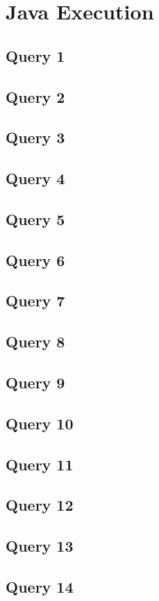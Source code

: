 \documentclass[11pt]{article}
\begin{document}
\section{Java Execution}
\subsection{Query 1}
\subsection{Query 2}
\subsection{Query 3}
\subsection{Query 4}
\subsection{Query 5}
\subsection{Query 6}
\subsection{Query 7}
\subsection{Query 8}
\subsection{Query 9}
\subsection{Query 10}
\subsection{Query 11}
\subsection{Query 12}
\subsection{Query 13}
\subsection{Query 14}
\end{document}
